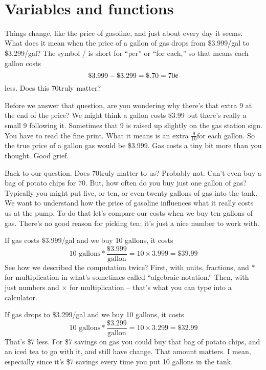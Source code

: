 ~\vspace{.1in}

\section{Variables and functions}

Things change, like the price of gasoline, and just about every day it seems.  What does it mean when the price of a gallon of gas drops from \$3.999/gal to \$3.299/gal?  The symbol / is short for ``per'' or ``for each,''  so that means each gallon costs
$$\$3.999-\$3.299=\$.70 = 70\text{\textcent}$$ less.  Does this 70\textcent \hspace{.05in}truly matter?

Before we answer that question, are you wondering why there's that extra 9 at the end of the price?  We might think a gallon costs \$3.99 but there's really a small 9 following it.  Sometimes that 9 is raised up slightly on the gas station sign.  You have to read the fine print.  What it means is an extra $ \frac{9}{10}$\textcent \hspace{.05in}for each gallon.  So the true price of a gallon gas would be \$3.999.  Gas costs a tiny bit more than you thought.  Good grief.

Back to our question.  Does 70\textcent \hspace{.05in}truly matter to us?  Probably not.  Can't even buy a bag of potato chips for 70\textcent.  But, how often do you buy just one gallon of gas?  Typically you might put five, or ten, or even twenty gallons of gas into the tank.  We want to understand how the price of gasoline influences what it really costs us at the pump.  To do that let's compare our costs when we buy ten gallons of gas.  There's no good reason for picking ten; it's just a nice number to work with.

If gas costs \$3.999/gal and we buy 10 gallons, it costs 
$$10 \text{ gallons} \ast \frac{\$3.999}{\text{gallon}} = 10 \times 3.999  = \$39.99$$   
See how we described the computation twice?  First, with units, fractions, and $\ast$ for multiplication in what's sometimes called ``algebraic notation.''  Then, with just numbers and $\times$ for multiplication -- that's what you can type into a calculator.  

If gas drops to \$3.299/gal and we buy 10 gallons, it costs 
$$10 \text{ gallons} \ast \frac{\$3.299}{\text{gallon}} = 10 \times 3.299  = \$32.99$$
That's \$7 less.  For \$7 savings on gas you could buy that bag of potato chips, and an iced tea to go with it, and still have change. That amount matters.  I mean, especially since it's \$7 savings every time you put 10 gallons in the tank.

